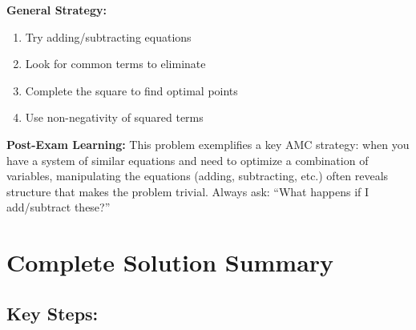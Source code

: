 \documentclass[12pt]{article}
\begin{document}
\begin{competitionbox}
\textbf{General Strategy:}
\begin{enumerate}
    \item Try adding/subtracting equations
    \item Look for common terms to eliminate
    \item Complete the square to find optimal points
    \item Use non-negativity of squared terms
\end{enumerate}
\end{competitionbox}

\vspace{1em}

\begin{protipbox}
\textbf{Post-Exam Learning:} This problem exemplifies a key AMC strategy: when you have a system of similar equations and need to optimize a combination of variables, manipulating the equations (adding, subtracting, etc.) often reveals structure that makes the problem trivial. Always ask: ``What happens if I add/subtract these?''
\end{protipbox}

\newpage

\section*{Complete Solution Summary}

\subsection*{Key Steps:}
\end{document}
